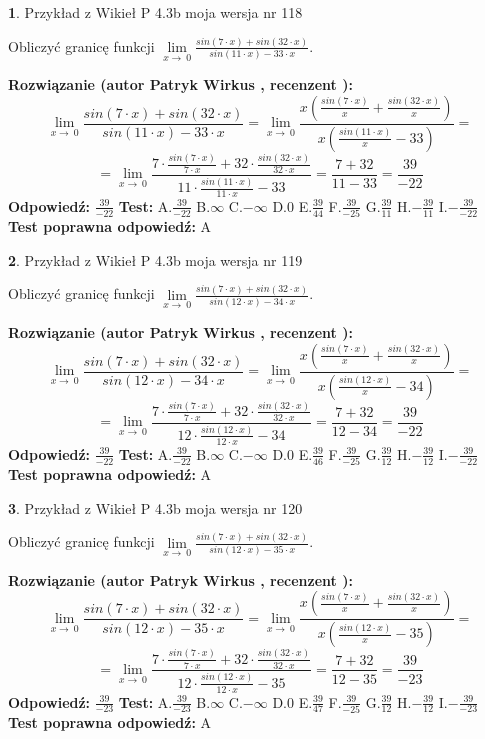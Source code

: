 \documentclass[12pt, a4paper]{article}
\theoremstyle{definition} %
\newtheorem{zad}{}
\newcommand{\zadStart}[1]{\begin{zad}#1\newline}
\newcommand{\zadStop}{\end{zad}}
\newcommand{\rozwStart}[2]{\noindent \textbf{Rozwiązanie (autor #1 , recenzent #2): }\newline}
\newcommand{\rozwStop}{\newline}
\newcommand{\odpStart}{\noindent \textbf{Odpowiedź:}\newline}
\newcommand{\odpStop}{\newline}
\newcommand{\testStart}{\noindent \textbf{Test:}\newline}
\newcommand{\testStop}{\newline}
\newcommand{\kluczStart}{\noindent \textbf{Test poprawna odpowiedź:}\newline}
\newcommand{\kluczStop}{\newline}
\begin{document}
\zadStart{Przykład z Wikieł P 4.3b moja wersja nr 118}


Obliczyć granicę funkcji $\lim\limits_{x\to\ 0}\frac{sin(7 \cdot x)+sin(32 \cdot x)}{sin(11 \cdot x)-33 \cdot x}$.
\zadStop
\rozwStart{Patryk Wirkus}{}
$$\lim\limits_{x\to\ 0}\frac{sin(7 \cdot x)+sin(32 \cdot x)}{sin(11 \cdot x)-33 \cdot x}=\lim\limits_{x\to\ 0}\frac{x(\frac{sin(7 \cdot x)}{x}+\frac{sin(32 \cdot x)}{x})}{x(\frac{sin(11 \cdot x)}{x}-33)}=$$
$$=\lim\limits_{x\to\ 0}\frac{7 \cdot \frac{sin(7 \cdot x)}{7 \cdot x}+32 \cdot \frac{sin(32 \cdot x)}{32 \cdot x}}{11 \cdot \frac{sin(11 \cdot x)}{11 \cdot x}-33}=\frac{7+32}{11-33} = \frac{39}{-22}$$
\rozwStop
\odpStart
$\frac{39}{-22}$
\odpStop
\testStart
A.$\frac{39}{-22}$
B.$\infty$
C.$-\infty$
D.$0$
E.$\frac{39}{44}$
F.$\frac{39}{-25}$
G.$\frac{39}{11}$
H.$-\frac{39}{11}$
I.$-\frac{39}{-22}$
\testStop
\kluczStart
A
\kluczStop



\zadStart{Przykład z Wikieł P 4.3b moja wersja nr 119}


Obliczyć granicę funkcji $\lim\limits_{x\to\ 0}\frac{sin(7 \cdot x)+sin(32 \cdot x)}{sin(12 \cdot x)-34 \cdot x}$.
\zadStop
\rozwStart{Patryk Wirkus}{}
$$\lim\limits_{x\to\ 0}\frac{sin(7 \cdot x)+sin(32 \cdot x)}{sin(12 \cdot x)-34 \cdot x}=\lim\limits_{x\to\ 0}\frac{x(\frac{sin(7 \cdot x)}{x}+\frac{sin(32 \cdot x)}{x})}{x(\frac{sin(12 \cdot x)}{x}-34)}=$$
$$=\lim\limits_{x\to\ 0}\frac{7 \cdot \frac{sin(7 \cdot x)}{7 \cdot x}+32 \cdot \frac{sin(32 \cdot x)}{32 \cdot x}}{12 \cdot \frac{sin(12 \cdot x)}{12 \cdot x}-34}=\frac{7+32}{12-34} = \frac{39}{-22}$$
\rozwStop
\odpStart
$\frac{39}{-22}$
\odpStop
\testStart
A.$\frac{39}{-22}$
B.$\infty$
C.$-\infty$
D.$0$
E.$\frac{39}{46}$
F.$\frac{39}{-25}$
G.$\frac{39}{12}$
H.$-\frac{39}{12}$
I.$-\frac{39}{-22}$
\testStop
\kluczStart
A
\kluczStop



\zadStart{Przykład z Wikieł P 4.3b moja wersja nr 120}


Obliczyć granicę funkcji $\lim\limits_{x\to\ 0}\frac{sin(7 \cdot x)+sin(32 \cdot x)}{sin(12 \cdot x)-35 \cdot x}$.
\zadStop
\rozwStart{Patryk Wirkus}{}
$$\lim\limits_{x\to\ 0}\frac{sin(7 \cdot x)+sin(32 \cdot x)}{sin(12 \cdot x)-35 \cdot x}=\lim\limits_{x\to\ 0}\frac{x(\frac{sin(7 \cdot x)}{x}+\frac{sin(32 \cdot x)}{x})}{x(\frac{sin(12 \cdot x)}{x}-35)}=$$
$$=\lim\limits_{x\to\ 0}\frac{7 \cdot \frac{sin(7 \cdot x)}{7 \cdot x}+32 \cdot \frac{sin(32 \cdot x)}{32 \cdot x}}{12 \cdot \frac{sin(12 \cdot x)}{12 \cdot x}-35}=\frac{7+32}{12-35} = \frac{39}{-23}$$
\rozwStop
\odpStart
$\frac{39}{-23}$
\odpStop
\testStart
A.$\frac{39}{-23}$
B.$\infty$
C.$-\infty$
D.$0$
E.$\frac{39}{47}$
F.$\frac{39}{-25}$
G.$\frac{39}{12}$
H.$-\frac{39}{12}$
I.$-\frac{39}{-23}$
\testStop
\kluczStart
A
\kluczStop
\end{document}
